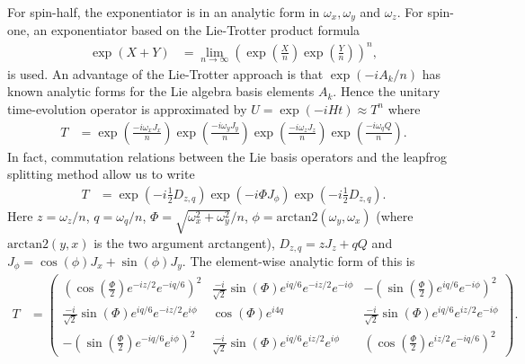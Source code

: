 \documentclass{jors}
\begin{document}
		For spin-half, the exponentiator is in an analytic form in $ \omega_x, \omega_y $ and $ \omega_z $. %
		For spin-one, an exponentiator based on the Lie-Trotter product formula\cite{moler_nineteen_2003}
		\begin{align}
			\exp\left( X + Y\right) &= \lim_{n\to\infty} \left(\exp\left(\frac{X}{n}\right) \exp\left(\frac{Y}{n}\right)\right)^n,\label{eq:lie_trotter}
		\end{align}
		is used.
		An advantage of the Lie-Trotter approach is that $ \exp(-iA_k/n) $ has known analytic forms for the Lie algebra basis elements $ A_k $.
		Hence the unitary time-evolution operator is approximated by $ U = \exp(-iHt) \approx T^n $ where
		\begin{align}
			T &= \exp\left(\frac{-i \omega_x J_x}{n}\right) \exp\left(\frac{-i \omega_y J_y}{n}\right) \exp\left(\frac{-i \omega_z J_z}{n}\right) \exp\left(\frac{-i \omega_q Q}{n}\right).
		\end{align}
		In fact, commutation relations between the Lie basis operators and the leapfrog splitting method\cite{barthel_optimized_2020} allow us to write 
		\begin{align}
			T &= \exp\left(-i\frac12D_{z,q}\right)\exp(-i\Phi J_\phi)\exp\left(-i\frac12D_{z,q}\right).
		\end{align}
		Here $ z = \omega_z/n $, $q = \omega_q/n $, $ \Phi = \sqrt{\omega_x^2 + \omega_y^2}/n $, $ \phi = \mathrm{arctan}2(\omega_y, \omega_x) $ (where $ \mathrm{arctan}2(y, x) $ is the two argument arctangent\cite{organick_fortran_1966}), $ D_{z,q} = zJ_z + qQ $ and $ J_\phi = \cos(\phi) J_x + \sin(\phi) J_y $.
		The element-wise analytic form of this is
		\begin{align}
			T &= \begin{pmatrix}
				\left(\cos\left(\frac{\Phi}{2}\right) e^{-iz/2}e^{-iq/6}\right)^2 & \frac{-i}{\sqrt{2}} \sin(\Phi)e^{iq/6}e^{-iz/2}e^{-i\phi} & -\left(\sin\left(\frac{\Phi}{2}\right)e^{iq/6}e^{-i\phi}\right)^2\\
				\frac{-i}{\sqrt{2}} \sin(\Phi)e^{iq/6}e^{-iz/2}e^{i\phi} & \cos(\Phi)e^{i4q} & \frac{-i}{\sqrt{2}} \sin(\Phi)e^{iq/6}e^{iz/2}e^{-i\phi}\\
				-\left(\sin\left(\frac{\Phi}{2}\right)e^{-iq/6}e^{i\phi}\right)^2 & \frac{-i}{\sqrt{2}} \sin(\Phi)e^{iq/6}e^{iz/2}e^{i\phi} & \left(\cos\left(\frac{\Phi}{2}\right) e^{iz/2}e^{-iq/6}\right)^2
			\end{pmatrix}.\label{eq:lie_trotter_4}
		\end{align}
\end{document}
